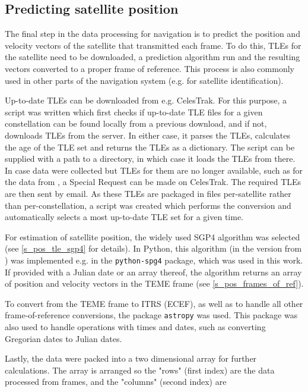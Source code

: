\subsection{Predicting satellite position}
The final step in the data processing for navigation is to predict the position and velocity vectors of the satellite that transmitted each frame. To do this, TLEs for the satellite need to be downloaded, a prediction algorithm run and the resulting vectors converted to a proper frame of reference. This process is also commonly used in other parts of the navigation system (e.g. for satellite identification).

Up-to-date TLEs can be downloaded from e.g. CelesTrak\cite{des11}. For this purpose, a script was written which first checks if up-to-date TLE files for a given constellation can be found locally from a previous download, and if not, downloads TLEs from the server. In either case, it parses the TLEs, calculates the age of the TLE set and returns the TLEs as a dictionary. The script can be supplied with a path to a directory, in which case it loads the TLEs from there. In case data were collected but TLEs for them are no longer available, such as for the data from \cite{sat08}, a Special Request can be made on CelesTrak. The required TLEs are then sent by email. As these TLEs are packaged in files per-satellite rather than per-constellation, a  script was created which performs the conversion and automatically selects a most up-to-date TLE set for a given time.

For estimation of satellite position, the widely used SGP4 algorithm was selected (see \autoref{s_pos_tle_sgp4} for details). In Python, this algorithm (in the version from \cite{pos06}) was implemented e.g. in the \texttt{python-spg4} package\cite{des12}, which was used in this work. If provided with a Julian date or an array thereof, the algorithm returns an array of position and velocity vectors in the TEME frame (see \autoref{s_pos_frames_of_ref}).

To convert from the TEME frame to ITRS (ECEF), as well as to handle all other frame-of-reference conversions, the package \texttt{astropy}\cite{des13} was used. This package was also used to handle operations with times and dates, such as converting Gregorian dates to Julian dates.

Lastly, the data were packed into a two dimensional array for further calculations. The array is arranged so the "rows" (first index) are the data processed from frames, and the "columns" (second index) are

